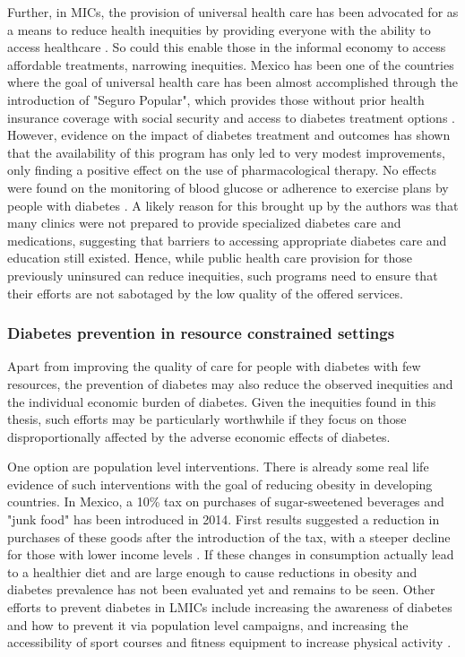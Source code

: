 Further, in \acp{MIC}, the provision of universal health care has been advocated for as a means to reduce health inequities by providing everyone with the ability to access healthcare \parencite{Marmot2008}. So could this enable those in the informal economy to access affordable treatments, narrowing inequities.  Mexico has been one of the countries where the goal of universal health care has been almost accomplished through the introduction of "Seguro Popular", which provides those without prior health insurance coverage with social security and access to diabetes treatment options \parencite{Knaul2012,Rivera-Hernandez2016}. However, evidence on the impact of diabetes treatment and outcomes has shown that the availability of this program has only led to very modest improvements, only finding a positive effect on the use of pharmacological therapy. No effects were found on the monitoring of blood glucose or adherence to exercise plans by people with diabetes \parencite{Rivera-Hernandez2016}. A likely reason for this brought up by the authors was that many clinics were not prepared to provide specialized diabetes care and medications, suggesting that barriers to accessing appropriate diabetes care and education still existed. Hence, while public health care provision for those previously uninsured can reduce inequities, such programs need to ensure that their efforts are not sabotaged by the low quality of the offered services.

\subsubsection*{Diabetes prevention in resource constrained settings}

Apart from improving the quality of care for people with diabetes with few resources, the prevention of diabetes may also reduce the observed inequities and the individual economic burden of diabetes. Given the inequities found in this thesis, such efforts may be particularly worthwhile if they focus on those disproportionally affected by the adverse economic effects of diabetes.

One option are population level interventions. There is already some real life evidence of such interventions with the goal of reducing obesity in developing countries. In Mexico, a 10\% tax on purchases of sugar-sweetened beverages and "junk food" has been introduced in 2014. First results suggested a reduction in purchases of these goods after the introduction of the tax, with a steeper decline for those with lower income levels \parencite{Colchero2016,Batis2016}. If these changes in consumption actually lead to a healthier diet and are large enough to cause reductions in obesity and diabetes prevalence has not been evaluated yet and remains to be seen. Other efforts to prevent diabetes in \acp{LMIC} include increasing the awareness of diabetes and how to prevent it via population level campaigns, and  increasing the accessibility of sport courses and fitness equipment to increase physical activity \textcite{Cefalu2016}. 

